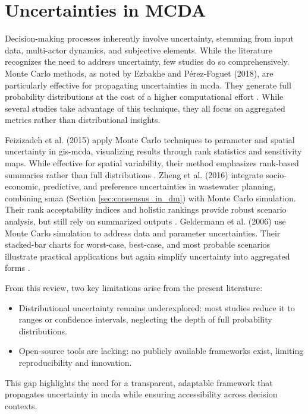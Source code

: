 \section{Uncertainties in MCDA}
Decision-making processes inherently involve uncertainty, stemming from input data, multi-actor dynamics, and subjective elements. While the literature recognizes the need to address uncertainty, few studies do so comprehensively. Monte Carlo methods, as noted by Ezbakhe and Pérez-Foguet (2018), are particularly effective for propagating uncertainties in \gls{mcda}. They generate full probability distributions at the cost of a higher computational effort \cite{Ezbakhe2018}. While several studies take advantage of this technique, they all focus on aggregated metrics rather than distributional insights.

Feizizadeh et al. (2015) apply Monte Carlo techniques to parameter and spatial uncertainty in \gls{gis}-\gls{mcda}, visualizing results through rank statistics and sensitivity maps. While effective for spatial variability, their method emphasizes rank-based summaries rather than full distributions \cite{feizizadeh2015sensitivity}. Zheng et al. (2016) integrate socio-economic, predictive, and preference uncertainties in wastewater planning, combining \gls{smaa} (Section \ref{sec:consensus_in_dm}) with Monte Carlo simulation. Their rank acceptability indices and holistic rankings provide robust scenario analysis, but still rely on summarized outputs \cite{zheng2016scenario}. Geldermann et al. (2006) use Monte Carlo simulation to address data and parameter uncertainties. Their stacked-bar charts for worst-case, best-case, and most probable scenarios illustrate practical applications but again simplify uncertainty into aggregated forms \cite{geldermann2006multi}.

From this review, two key limitations arise from the present literature:
\begin{itemize}
    \item Distributional uncertainty remains underexplored: most studies reduce it to ranges or confidence intervals, neglecting the depth of full probability distributions.
    \item Open-source tools are lacking: no publicly available frameworks exist, limiting reproducibility and innovation.
\end{itemize}

This gap highlights the need for a transparent, adaptable framework that propagates uncertainty in \gls{mcda} while ensuring accessibility across decision contexts.
